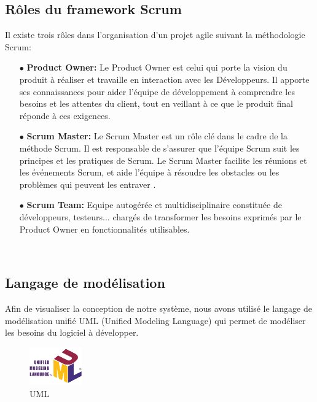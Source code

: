 \subsection{ Rôles du framework Scrum}
Il existe trois rôles dans l'organisation d'un projet agile suivant la méthodologie Scrum:\\
\begin{itemize}

    \item[$\bullet$]\textbf{Product Owner: }Le Product Owner est celui qui porte la vision du produit à réaliser et travaille en interaction avec les Développeurs. Il apporte ses connaissances pour aider l'équipe de développement à comprendre les besoins et les attentes du client, tout en veillant à ce que le produit final réponde à ces exigences.\\
    \item[$\bullet$]\textbf{Scrum Master: }Le Scrum Master est un rôle clé dans le cadre de la méthode Scrum. Il est responsable de s'assurer que l'équipe Scrum suit les principes et les pratiques de Scrum. Le Scrum Master  facilite les réunions et les événements Scrum, et aide l'équipe à résoudre les obstacles ou les problèmes qui peuvent les entraver .\\
    \item[$\bullet$]\textbf{Scrum Team: }Equipe autogérée et multidisciplinaire constituée de développeurs, testeurs...  chargés de transformer les besoins exprimés par le Product Owner en fonctionnalités utilisables.
\end{itemize}
\




\subsection{ Langage de modélisation}
Afin de visualiser la conception de notre système, nous avons utilisé le langage de modélisation unifié UML (Unified Modeling Language) qui permet de modéliser les besoins du logiciel à développer.

\begin{figure}[ht]
    \centering
    \includegraphics[width=0.2\textwidth]{chap1.images/UML.png}
    \caption{UML}
\end{figure}


